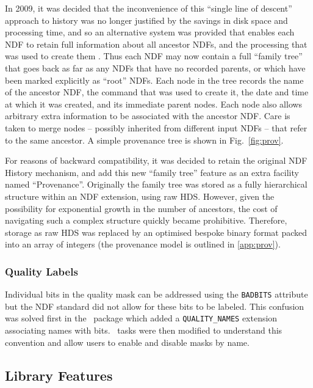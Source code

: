 \documentclass[final,authoryear,5p,times,twocolumn]{elsarticle}
\begin{document}
In 2009, it was decided that the inconvenience of this ``single line of
descent'' approach to history was no longer justified by the savings in
disk space and processing time, and so an alternative system was
provided that enables each NDF to retain full information about all
ancestor NDFs, and the processing that was used to create them \citep{2009ASPC..411..418J,2011tfa..confE..42J}. Thus
each NDF may now contain a full ``family tree'' that goes back as far as
any NDFs that have no recorded parents, or which have been marked
explicitly as ``root'' NDFs. Each node in the tree records the name of
the ancestor NDF, the command that was used to create it, the date and
time at which it was created, and its immediate parent nodes. Each
node also allows arbitrary extra information to be associated with the
ancestor NDF. Care is taken to merge nodes -- possibly inherited from
different input NDFs -- that refer to the same ancestor. A simple
provenance tree is shown in Fig.~\ref{fig:prov}.

For reasons of backward compatibility, it was decided to retain the
original NDF History mechanism, and add this new ``family tree''
feature as an extra facility named ``Provenance''.  Originally the
family tree was stored as a fully hierarchical structure within an NDF
extension, using raw HDS. However, given the possibility for
exponential growth in the number of ancestors, the cost of navigating
such a complex structure quickly became prohibitive. Therefore,
storage as raw HDS was replaced by an optimised bespoke binary format
packed into an array of integers (the provenance model is outlined in
\ref{app:prov}).

\subsubsection{Quality Labels}

Individual bits in the quality mask can be addressed using the
\texttt{BADBITS} attribute but the NDF standard did not allow for
these bits to be labeled. This confusion was solved first in the
\iras\ package \citep{SUN165} which added a \texttt{QUALITY\_NAMES}
extension associating names with bits. \KAPPA\ tasks \citep{SUN95} were then
modified to understand this convention and allow users to enable and
disable masks by name.

\subsection{Library Features}
\end{document}

